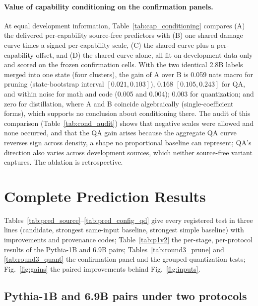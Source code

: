 \paragraph{Value of capability conditioning on the confirmation panels.}
At equal development information, Table~\ref{tab:cap_conditioning}
compares (A) the delivered per-capability source-free predictors with
(B) one shared damage curve times a signed per-capability scale, (C)
the shared curve plus a per-capability offset, and (D) the shared
curve alone, all fit on development data only and scored on the
frozen confirmation cells. With the two identical 2.8B labels merged
into one state (four clusters), the gain of A over B is 0.059 nats
macro for pruning (state-bootstrap interval $[0.021,0.103]$), 0.168
$[0.105,0.243]$ for QA, and within noise for math and code (0.005 and
0.004); 0.003 for quantization; and zero for distillation, where A
and B coincide algebraically (single-coefficient forms), which
supports no conclusion about conditioning there. The audit of this
comparison (Table~\ref{tab:cond_audit}) shows that negative scales were allowed
and none occurred, and that the QA gain arises because the aggregate
QA curve reverses sign across density, a shape no proportional
baseline can represent; QA's direction also varies across
development sources, which neither source-free variant captures. The
ablation is retrospective.


\FloatBarrier

\section{Complete Prediction Results}
\label{sec:app_results}


Tables~\ref{tab:pred_source}--\ref{tab:pred_config_qd} give every registered test in three lines (candidate,
strongest same-input baseline, strongest simple baseline) with improvements and provenance codes;
Table~\ref{tab:p1v2} the per-stage, per-protocol results of the Pythia-1B and 6.9B pairs; Tables~\ref{tab:round3_prune}
and \ref{tab:round3_quant} the confirmation panel and the grouped-quantization tests; Fig.~\ref{fig:gains} the paired
improvements behind Fig.~\ref{fig:inputs}.




\subsection{Pythia-1B and 6.9B pairs under two protocols}
\label{sec:app_p1v2}

